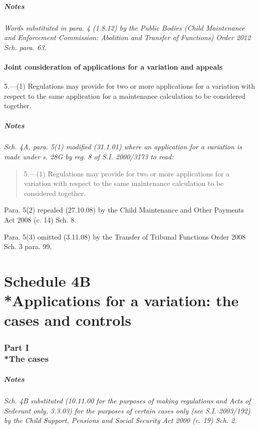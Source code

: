 \documentclass[a4paper]{article}
\newcommand{\parthead}{}
\newcommand\amendment[1]{\subsubsection*{Notes}{\itshape\frenchspacing\footnotesize #1 \par}}
\begin{document}
{\amendment{
Words substituted in para. 4 (1.8.12) by the Public Bodies (Child Maintenance and Enforcement Commission: Abolition and Transfer of Functions) Order 2012 Sch. para. 63.
}

\subsection*{Joint consideration of applications for a variation and appeals}

5.---(1) Regulations may provide for two or more applications for a variation with respect to the same application for a maintenance calculation to be considered together.


\amendment{
Sch. 4A, para. 5(1) modified (31.1.01) where an application for a variation is made under s. 28G by reg. 8 of S.I. 2000/3173 to read:
\begin{quotation}
5.—(1) Regulations may provide for two or more applications for a variation with respect to the same maintenance calculation to be considered together.
\end{quotation}

Para. 5(2) repealed (27.10.08) by the Child Maintenance and Other Payments Act 2008 (c. 14) Sch. 8.

Para. 5(3) omitted (3.11.08) by the Transfer of Tribunal Functions Order 2008 Sch. 3 para. 99.

}

\part[Schedule 4B --- Applications for a variation: the cases and controls]{Schedule 4B\\*Applications for a variation: the cases and controls}

\section[Part I --- The cases]{Part I\\*The cases}

\renewcommand\parthead{--- Schedule 4B Part I}

\amendment{
Sch. 4B substituted (10.11.00 for the purposes of making regulations and Acts of Sederunt only, 3.3.03) for the purposes of certain cases only (see S.I. 2003/192) by the Child Support, Pensions and Social Security Act 2000 (c. 19) Sch. 2.
}

}
\end{document}
